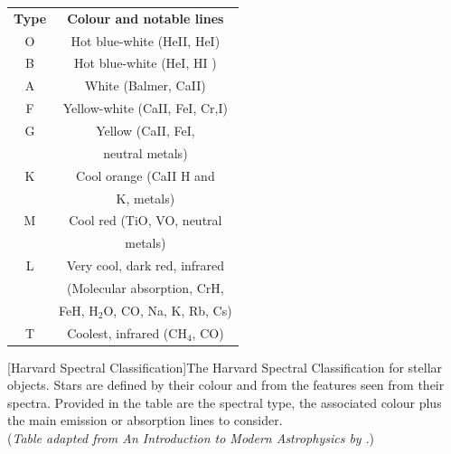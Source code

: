 \documentclass[12pt, twocolumn]{revtex4}    %
\begin{document}
\begin{center}
\begin{tabular}{c@{\hskip 20pt}c} 
 \hline
 \textbf{Type} & \textbf{Colour and notable lines} \\ [0.5ex] 
 O & Hot blue-white (HeII, HeI) \\
 B & Hot blue-white (HeI, HI ) \\
 A & White (Balmer, CaII) \\
 F & Yellow-white (CaII, FeI, Cr,I) \\
 G & Yellow (CaII, FeI,  \\
  & neutral metals) \\
 K & Cool orange (CaII H and \\ 
  & K, metals) \\
 M & Cool red (TiO, VO, neutral \\
  & metals) \\
 L & Very cool, dark red, infrared \\
  & (Molecular absorption, CrH, \\
  & FeH, H$_2$O, CO, Na, K, Rb, Cs) \\
 T & Coolest, infrared (CH$_4$, CO) \\
 \hline
\end{tabular}
[Harvard Spectral Classification]{The Harvard Spectral Classification for stellar objects. Stars are defined by their colour and from the features seen from their spectra. Provided in the table are the spectral type, the associated colour plus the main emission or absorption lines to consider. \\
(\textit{Table adapted from An Introduction to Modern Astrophysics by \cite{carroll_astro}}.)}
\label{table:spectral_classification}
\end{center}
\end{document}
